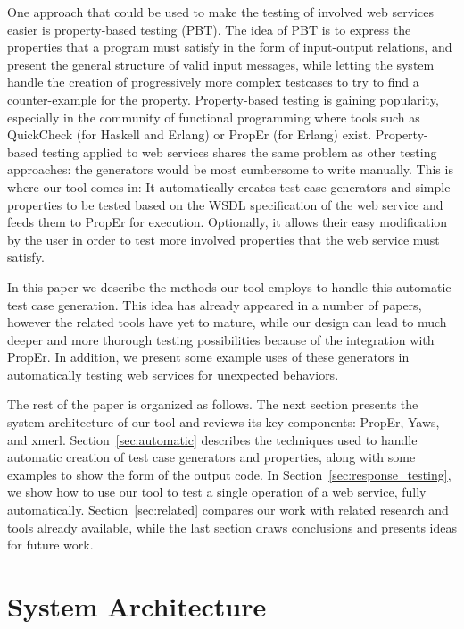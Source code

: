 \documentclass[submission,copyright]{eptcs}
\begin{document}
One approach that could be used to make the testing of involved web
services easier is property-based testing (PBT). The idea of PBT is to
express the properties that a program must satisfy in the form of
input-output relations, and present the general structure of valid
input messages, while letting the system handle the creation of
progressively more complex testcases to try to find a counter-example
for the property. Property-based testing is gaining popularity,
especially in the community of functional programming where tools such
as QuickCheck (for Haskell and Erlang) or PropEr (for Erlang) exist.
%
Property-based testing applied to web services shares the same problem
as other testing approaches: the generators would be most cumbersome
to write manually. This is where our tool comes in: It automatically
creates test case generators and simple properties to be tested based
on the WSDL specification of the web service and feeds them to PropEr
for execution. Optionally, it allows their easy modification by the
user in order to test more involved properties that the web service
must satisfy.


In this paper we describe the methods our tool employs to handle this
automatic test case generation. This idea has already appeared in a
number of papers, however the related tools have yet to mature, while
our design can lead to much deeper and more thorough testing
possibilities because of the integration with PropEr. In addition, we
present some example uses of these generators in automatically testing
web services for unexpected behaviors.


The rest of the paper is organized as follows.
The next section presents the system architecture of our tool and
reviews its key components: PropEr, Yaws, and xmerl.
Section~\ref{sec:automatic} describes the techniques used to handle
automatic creation of test case generators and properties, along with
some examples to show the form of the output code.
In Section~\ref{sec:response_testing}, we show how to use our tool to
test a single operation of a web service, fully automatically.
Section~\ref{sec:related} compares our work with related research and
tools already available, while the last section draws conclusions and
presents ideas for future work.

\section{System Architecture} \label{sec:architecture}
\end{document}
